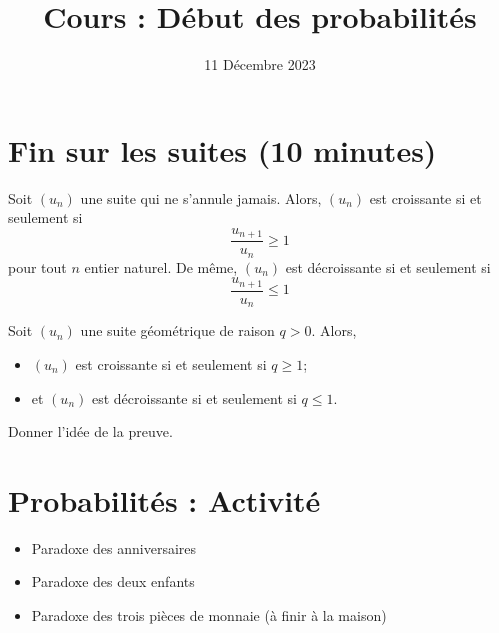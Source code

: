 \documentclass{article}
\title{Cours : Début des probabilités}
\date{11 Décembre 2023}
\begin{document}
\maketitle
\section{Fin sur les suites (10 minutes)}
\begin{proposition}
Soit $(u_n)$ une suite qui ne s'annule jamais. Alors, $(u_n)$ est croissante si et seulement si
\begin{equation*}
\dfrac{u_{n+1}}{u_n} \geq 1    
\end{equation*}
pour tout $n$ entier naturel.
De même, $(u_n)$ est décroissante si et seulement si
\begin{equation*}
\dfrac{u_{n+1}}{u_n} \leq 1    
\end{equation*}
\end{proposition}
\begin{proposition}
Soit $(u_n)$ une suite géométrique de raison $q > 0$. Alors,
\begin{itemize}
\item $(u_n)$ est croissante si et seulement si $q \geq 1$;
\item et $(u_n)$ est décroissante si et seulement si $q \leq 1$. 
\end{itemize}
\end{proposition}
Donner l'idée de la preuve.
\section{Probabilités : Activité}
\begin{itemize}
\item Paradoxe des anniversaires
\item Paradoxe des deux enfants
\item Paradoxe des trois pièces de monnaie (à finir à la maison)
\end{itemize}
\end{document}
